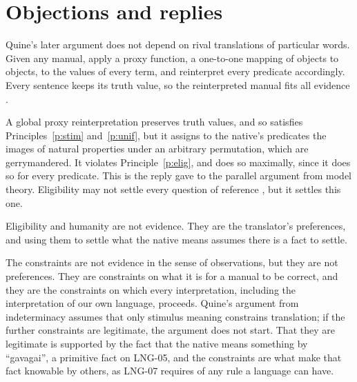 \documentclass{situationist-preprint}
\begin{document}
\section{Objections and replies}

\begin{objection}
Quine's later argument does not depend on rival translations of particular words. Given any manual, apply a proxy function, a one-to-one mapping of objects to objects, to the values of every term, and reinterpret every predicate accordingly. Every sentence keeps its truth value, so the reinterpreted manual fits all evidence \citep{Quine1969}.
\end{objection}

\begin{reply}
A global proxy reinterpretation preserves truth values, and so satisfies Principles~\ref{p:stim} and~\ref{p:unif}, but it assigns to the native's predicates the images of natural properties under an arbitrary permutation, which are gerrymandered. It violates Principle~\ref{p:elig}, and does so maximally, since it does so for every predicate. This is the reply \citet{Lewis1984} gave to the parallel argument from model theory. Eligibility may not settle every question of reference \citep{Williams2007}, but it settles this one.
\end{reply}

\begin{objection}
Eligibility and humanity are not evidence. They are the translator's preferences, and using them to settle what the native means assumes there is a fact to settle.
\end{objection}

\begin{reply}
The constraints are not evidence in the sense of observations, but they are not preferences. They are constraints on what it is for a manual to be correct, and they are the constraints on which every interpretation, including the interpretation of our own language, proceeds. Quine's argument from indeterminacy assumes that only stimulus meaning constrains translation; if the further constraints are legitimate, the argument does not start. That they are legitimate is supported by the fact that the native means something by \enquote{gavagai}, a primitive fact on LNG-05, and the constraints are what make that fact knowable by others, as LNG-07 requires of any rule a language can have.
\end{reply}
\end{document}
